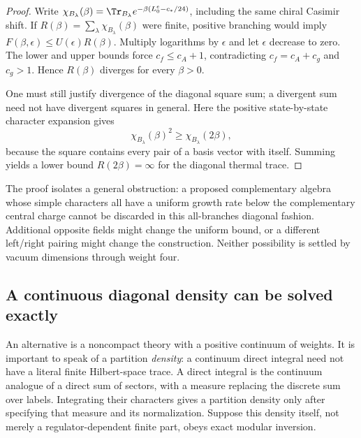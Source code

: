 \begin{proof}
Write
$\chi_{B_\lambda}(\beta)=\Tr_{B_\lambda}
e^{-\beta(L^e_0-c_*/24)}$, including the same chiral Casimir shift.
If $R(\beta)=\sum_\lambda\chi_{B_\lambda}(\beta)$ were finite,
positive branching would imply
$F(\beta,\epsilon)\leq U(\epsilon)R(\beta)$.
Multiply logarithms by $\epsilon$ and let $\epsilon$ decrease to
zero. The lower and upper bounds force $c_f\leq c_A+1$,
contradicting $c_f=c_A+c_g$ and $c_g>1$. Hence $R(\beta)$
diverges for every $\beta>0$.

One must still justify divergence of the diagonal square sum; a
divergent sum need not have divergent squares in general. Here the
positive state-by-state character expansion gives
\[
 \chi_{B_\lambda}(\beta)^2\geq\chi_{B_\lambda}(2\beta),
\]
because the square contains every pair of a basis vector with
itself. Summing yields a lower bound $R(2\beta)=\infty$ for
the diagonal thermal trace.
\end{proof}

The proof isolates a general obstruction: a proposed complementary
algebra whose simple characters all have a uniform growth rate below
the complementary central charge cannot be discarded in this
all-branches diagonal fashion. Additional opposite fields might
change the uniform bound, or a different left/right pairing might
change the construction. Neither possibility is settled by vacuum
dimensions through weight four.

\subsection{A continuous diagonal density can be solved exactly}

An alternative is a noncompact theory with a positive continuum of
weights. It is important to speak of a partition \emph{density}:
a continuum direct integral need not have a literal finite
Hilbert-space trace. A direct integral is the continuum analogue
of a direct sum of sectors, with a measure replacing the discrete
sum over labels. Integrating their characters gives a partition
density only after specifying that measure and its normalization.
Suppose this density itself, not merely a
regulator-dependent finite part, obeys exact modular inversion.

